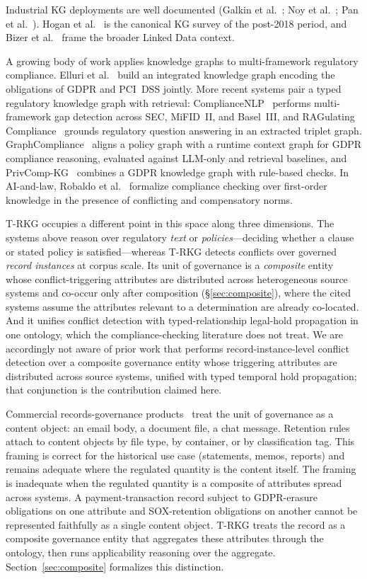 \documentclass{ieeeaccess}
\begin{document}
Industrial KG deployments are well documented (Galkin et al.~\cite{galkin2017}; Noy et al.~\cite{noy2019}; Pan et al.~\cite{pan2024}). Hogan et al.~\cite{hogan2021} is the canonical KG survey of the post-2018 period, and Bizer et al.~\cite{bizer2009,linkeddata} frame the broader Linked Data context.

A growing body of work applies knowledge graphs to multi-framework regulatory compliance. Elluri et al.~\cite{gdprpcikg} build an integrated knowledge graph encoding the obligations of GDPR and PCI~DSS jointly. More recent systems pair a typed regulatory knowledge graph with retrieval: ComplianceNLP~\cite{compliancenlp} performs multi-framework gap detection across SEC, MiFID~II, and Basel~III, and RAGulating Compliance~\cite{ragulating} grounds regulatory question answering in an extracted triplet graph. GraphCompliance~\cite{graphcompliance} aligns a policy graph with a runtime context graph for GDPR compliance reasoning, evaluated against LLM-only and retrieval baselines, and PrivComp-KG~\cite{privcompkg} combines a GDPR knowledge graph with rule-based checks. In AI-and-law, Robaldo et al.~\cite{conflictnorms} formalize compliance checking over first-order knowledge in the presence of conflicting and compensatory norms.

T-RKG occupies a different point in this space along three dimensions. The systems above reason over regulatory \emph{text} or \emph{policies}---deciding whether a clause or stated policy is satisfied---whereas T-RKG detects conflicts over governed \emph{record instances} at corpus scale. Its unit of governance is a \emph{composite} entity whose conflict-triggering attributes are distributed across heterogeneous source systems and co-occur only after composition (§\ref{sec:composite}), where the cited systems assume the attributes relevant to a determination are already co-located. And it unifies conflict detection with typed-relationship legal-hold propagation in one ontology, which the compliance-checking literature does not treat. We are accordingly not aware of prior work that performs record-instance-level conflict detection over a composite governance entity whose triggering attributes are distributed across source systems, unified with typed temporal hold propagation; that conjunction is the contribution claimed here.

Commercial records-governance products~\cite{purview} treat the unit of governance as a content object: an email body, a document file, a chat message. Retention rules attach to content objects by file type, by container, or by classification tag. This framing is correct for the historical use case (statements, memos, reports) and remains adequate where the regulated quantity is the content itself. The framing is inadequate when the regulated quantity is a composite of attributes spread across systems. A payment-transaction record subject to GDPR-erasure obligations on one attribute and SOX-retention obligations on another cannot be represented faithfully as a single content object. T-RKG treats the record as a composite governance entity that aggregates these attributes through the ontology, then runs applicability reasoning over the aggregate. Section~\ref{sec:composite} formalizes this distinction.
\end{document}
